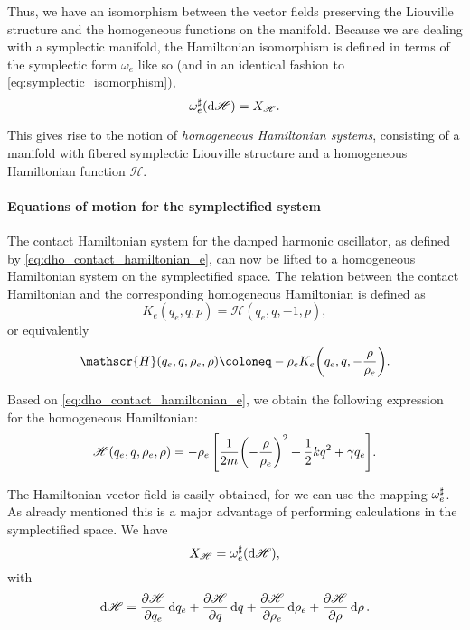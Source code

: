 Thus, we have an isomorphism between the vector fields preserving the Liouville structure and the homogeneous functions on the manifold. 
Because we are dealing with a symplectic manifold, the Hamiltonian isomorphism is defined in terms of the symplectic form \(\omega_e\) like so (and in an identical fashion to \cref{eq:symplectic_isomorphism}),
\begin{equation}
     \omega_e^\sharp(\dd{\mathscr{H}}) = X_\mathscr{H}.
\end{equation}

This gives rise to the notion of \emph{homogeneous Hamiltonian systems}, consisting of a manifold with fibered symplectic Liouville structure and a homogeneous Hamiltonian function \(\mathscr{H}\).

\paragraph{Equations of motion for the symplectified system} The contact Hamiltonian system for the damped harmonic oscillator, as defined by \cref{eq:dho_contact_hamiltonian_e}, can now be lifted to a homogeneous Hamiltonian system on the symplectified space. The relation between the contact Hamiltonian and the corresponding homogeneous Hamiltonian is defined as \cite{VanderSchaft2021a,Libermann1987,Arnold1989}
\begin{equation}
     K_e(q_e, q, p) = \mathscr{H}(q_e, q, -1, p),
\end{equation}
or equivalently
\begin{equation}
    \mathscr{H}(q_e, q, \rho_e, \rho) \coloneq -\rho_e K_e\qty(q_e, q, -\frac{\rho}{\rho_e}).
    \label{eq:H_contact_homo}
\end{equation}

Based on \cref{eq:dho_contact_hamiltonian_e}, we obtain the following expression for the homogeneous Hamiltonian:
\begin{equation}
    \mathscr{H}(q_e, q, \rho_e, \rho) = -\rho_e\,\qty[\frac{1}{2m}\qty(-\frac{\rho}{\rho_e})^2 + \frac{1}{2}kq^2 + \gamma q_e]. 
    \label{eq:H_dho_homo}
\end{equation}

The Hamiltonian vector field is easily obtained, for we can use the mapping \(\omega_e^\sharp\). As already mentioned this is a major advantage of performing calculations in the symplectified space. We have
\begin{equation}
     X_\mathscr{H} = \omega_e^\sharp(\dd{\mathscr{H}}),
\end{equation} 
with
\begin{equation}
     \dd{\mathscr{H}} = \pdv{\mathscr{H}}{q_e}\dd{q_e} 
                      + \pdv{\mathscr{H}}{q}\dd{q}
                      + \pdv{\mathscr{H}}{\rho_e}\dd{\rho_e}
                      + \pdv{\mathscr{H}}{\rho}\dd{\rho}.
\end{equation}


